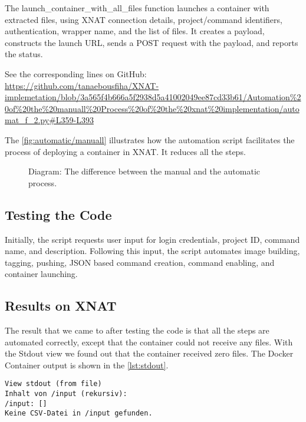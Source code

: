 The launch\_container\_with\_all\_files function launches a container with extracted files, using XNAT connection details, project/command identifiers, authentication, wrapper name, and the list of files. It creates a payload, constructs the launch URL, sends a POST request with the payload, and reports the status.




\noindent\footnotesize See the corresponding lines on GitHub:\url{ https://github.com/tanaebousfiha/XNAT-implemetation/blob/3a565f4b666a5f2938d5a41002049ee87cd33b61/Automation%20of%20the%20manuall%20Process%20of%20the%20xnat%20implementation/automat_f_2.py#L359-L393}
\normalsize


The \autoref{fig:automatic/manuall} illustrates how the automation script facilitates the process of deploying a container in XNAT. It reduces all the steps.

\begin{figure}[H]
    \centering
    \def\svgwidth{0.8\linewidth}
    
    \caption{Diagram: The difference between the manual and the automatic process.}
    \label{fig:automatic/manuall}
\end{figure}



\subsection{Testing the Code}
Initially, the script requests user input for login credentials, project ID, command name, and description. Following this input, the script automates image building, tagging, pushing, JSON based command creation, command enabling, and container launching.

\subsection{Results on XNAT}
The result that we came to after testing the code is that all the steps are automated correctly, except that the container could not receive any files. With the \ac{Stdout} view we found out that the container received zero files. The Docker Container output is shown in the \autoref{lst:stdout}.
 
\begin{lstlisting}[numbers=none, caption={stdout in XNAT.}, label={lst:stdout}]
View stdout (from file)
Inhalt von /input (rekursiv):
/input: []
Keine CSV-Datei in /input gefunden.
\end{lstlisting}


